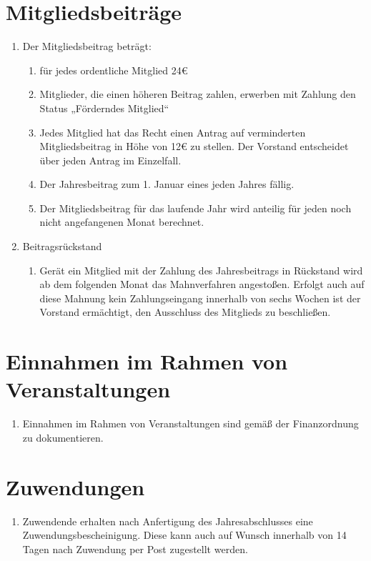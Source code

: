 \documentclass[12pt,a4paper,titlepage]{scrartcl}
\begin{document}
\section{Mitgliedsbeiträge}
\begin{enumerate}
\item Der Mitgliedsbeitrag beträgt:
	\begin{enumerate}
	\item für jedes ordentliche Mitglied 24€ 
	\item Mitglieder, die einen höheren Beitrag zahlen, erwerben mit Zahlung den Status 
„Förderndes Mitglied“ 
	\item Jedes Mitglied hat das Recht einen Antrag auf verminderten Mitgliedsbeitrag in 
Höhe von 12€ zu stellen. Der Vorstand entscheidet über jeden Antrag im 
Einzelfall. 
	\item Der Jahresbeitrag zum 1. Januar eines jeden Jahres fällig. 
	\item Der Mitgliedsbeitrag für das laufende Jahr wird anteilig für jeden noch nicht 
angefangenen Monat berechnet.   
	\end{enumerate}
\item Beitragsrückstand
	\begin{enumerate}
	\item Gerät ein Mitglied mit der Zahlung des Jahresbeitrags in Rückstand 
wird ab dem folgenden Monat das Mahnverfahren angestoßen. Erfolgt 
auch auf diese Mahnung kein Zahlungseingang innerhalb von sechs 
Wochen ist der Vorstand ermächtigt, den Ausschluss des Mitglieds zu 
beschließen.
	\end{enumerate}
\end{enumerate}
\section{Einnahmen im Rahmen von Veranstaltungen}
\begin{enumerate}
\item Einnahmen im Rahmen von Veranstaltungen sind gemäß der Finanzordnung zu 
dokumentieren. 	
\end{enumerate}

\section{Zuwendungen}
\begin{enumerate}
\item Zuwendende erhalten nach Anfertigung des Jahresabschlusses eine 
Zuwendungsbescheinigung. Diese kann auch auf Wunsch innerhalb von 14 Tagen nach 
Zuwendung per Post zugestellt werden.  
\end{enumerate}
\end{document}
